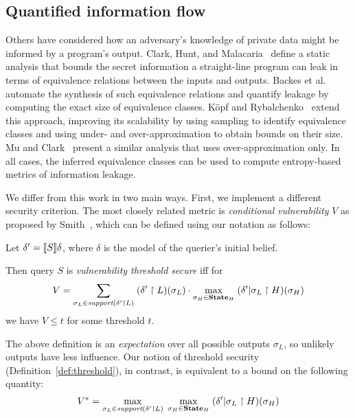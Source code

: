 \subsection{Quantified information flow}
Others have considered how an adversary's knowledge of private data
might be informed by a program's output.  Clark, Hunt, and
Malacaria~\cite{clark2005QIF} define a static analysis that bounds the
secret information a straight-line program can leak in terms of
equivalence relations between the inputs and outputs.  Backes et
al.~\cite{backes09automatic} automate the synthesis of such
equivalence relations and quantify leakage by computing the exact size
of equivalence classes.  K\"opf and
Rybalchenko~\cite{kopf:rybalchenko} extend this approach, improving
its scalability by using sampling to identify equivalence classes and
using under- and over-approximation to obtain bounds on their size.
Mu and Clark~\cite{Mu:2009:inverval-qif} present a similar analysis
that uses over-approximation only.  In all cases, the inferred
equivalence classes can be used to compute entropy-based metrics of
information leakage.

We differ from this work in two main ways.  First, we implement a
different security criterion.  The most closely related metric is
\emph{conditional vulnerability} $V$ as proposed by
Smith~\cite{smith09foundations}, which can be defined using our
notation as follows:%
\begin{definition}
\label{def:vul-threshold}
Let $\delta' = [\![{S}]\!]{\delta}$, where $\delta$ is the model of the
querier's initial belief.

Then query $S$ is \emph{vulnerability threshold secure} iff for
$$V = \sum_{\sigma_L \in \textit{support}(\delta' \upharpoonright L)}\;
  (\delta' \upharpoonright L)(\sigma_L) \cdot \max_{\sigma_H \in \textbf{State}_H}\;
  (\delta' | \sigma_L \upharpoonright H)(\sigma_H)$$
  we have $V \leq t$ for some threshold $t$.
\end{definition}
The above definition is an \emph{expectation} over all possible
outputs $\sigma_L$, so unlikely outputs have less influence.  Our
notion of threshold security (Definition~\ref{def:threshold}), in
contrast, is equivalent to a bound on the following quantity:
$$V^* = \max_{\sigma_L \in \textit{support}(\delta' \upharpoonright L)}\;
\max_{\sigma_H \in \textbf{State}_H}\;
(\delta' | \sigma_L \upharpoonright H)(\sigma_H)$$

